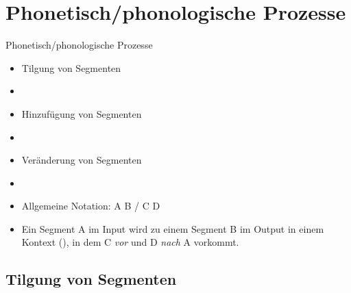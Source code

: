 %
\section{Phonetisch/phonologische Prozesse}
%

\begin{frame}{Phonetisch/phonologische Prozesse}

\begin{itemize}
	\item Tilgung von Segmenten
	\item[]
	\item Hinzufügung von Segmenten
	\item[]
	\item Veränderung von Segmenten
	\item[]
	\item Allgemeine Notation: A \ras B / C \underline{\quad} D
	\item[] Ein Segment A im Input wird zu einem Segment B im Output in einem Kontext (\gqq{/}), in dem C \textit{vor} und D \textit{nach} A vorkommt. 
\end{itemize}

\end{frame}



%
\subsection{Tilgung von Segmenten}
%

